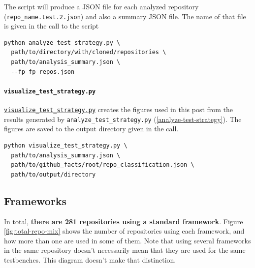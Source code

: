 \documentclass[]{article}
\let\oldparagraph\paragraph
\renewcommand{\paragraph}[1]{\oldparagraph{#1}\mbox{}}
\begin{document}
The script will produce a JSON file for each analyzed repository (\texttt{repo\_name.test.2.json}) and also a summary JSON file. The name of that file is given in the call to the script

\begin{verbatim}
python analyze_test_strategy.py \
  path/to/directory/with/cloned/repositories \
  path/to/analysis_summary.json \
  --fp fp_repos.json
\end{verbatim}

\hypertarget{visualize-test-strategy}{%
\paragraph{\texorpdfstring{\texttt{visualize\_test\_strategy.py}}{visualize\_test\_strategy.py}}\label{visualize-test-strategy}}

\href{https://github.com/LarsAsplund/github-facts/tree/main/py/visualize_test_strategy.py}{\texttt{visualize\_test\_strategy.py}} creates the figures used in this post from the results generated by \texttt{analyze\_test\_strategy.py} (\ref{analyze-test-strategy}). The figures are saved to the output directory given in the call.

\begin{verbatim}
python visualize_test_strategy.py \
  path/to/analysis_summary.json \
  path/to/github_facts/root/repo_classification.json \
  path/to/output/directory
\end{verbatim}

\hypertarget{frameworks}{%
\subsection{Frameworks}\label{frameworks}}

In total, \textbf{there are 281 repositories using a standard framework}. Figure \ref{fig:total-repo-mix} shows the number of repositories using each framework, and how more than one are used in some of them. Note that using several frameworks in the same repository doesn't necessarily mean that they are used for the same testbenches. This diagram doesn't make that distinction.
\end{document}
